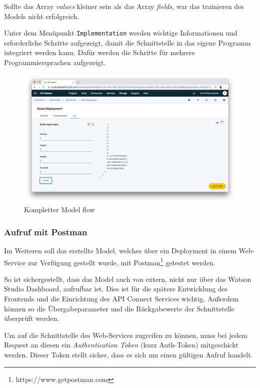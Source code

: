 Sollte das Array \textit{values} kleiner sein als das Array \textit{fields}, war das trainieren des Models nicht
erfolgreich.

Unter dem Menüpunkt \texttt{Implementation} werden wichtige Informationen und erforderliche Schritte aufgezeigt, damit
die Schnittstelle in das eigene Programm integriert werden kann. Dafür werden die Schritte für mehrere Programmiersprachen
aufgezeigt.

\begin{figure}[h]
    \centering
    \includegraphics[scale=0.26]{images/kapitel_3/deployment_test.png}
    \caption{Kompletter Model flow}
    \label{fig:umsetzung_model_flow}
\end{figure}

\subsubsection{Aufruf mit Postman}
\label{subsec:Aufruf mit Postman}
Im Weiteren soll das erstellte Model, welches über ein Deployment in einem Web-Service zur Verfügung gestellt wurde,
mit Postman\footnote{https://www.getpostman.com} getestet werden.

So ist sichergestellt, dass das Model auch von extern, nicht nur über das Watson Studio Dashboard, aufrufbar ist.
Dies ist für die spätere Entwicklung des Frontends und die Einrichtung des API Connect Services wichtig. Außerdem können
so die Übergabeparameter und die Rückgabewerte der Schnittstelle überprüft werden.

Um auf die Schnittstelle des Web-Services zugreifen zu können, muss bei jedem Request an diesen ein
\textit{Authentication Token} (kurz Auth-Token) mitgeschickt werden. Dieser Token stellt sicher, dass es sich um einen
gültigen Aufruf handelt.

